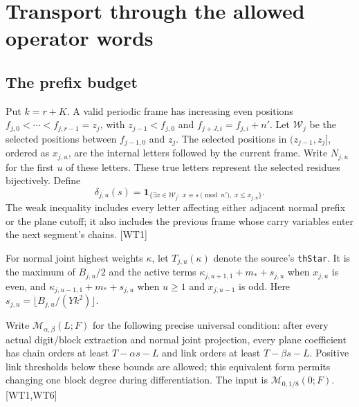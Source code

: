 \section{Transport through the allowed operator words}
\label{sec:word-transport}


\subsection{The prefix budget}

Put $k=r+K$. A valid periodic frame has increasing even positions
$f_{j,0}<\cdots<f_{j,r-1}=z_j$, with
$z_{j-1}<f_{j,0}$ and $f_{j+J,i}=f_{j,i}+n'$.
Let $\mathcal W_j$ be the selected positions between $f_{j-1,0}$ and $z_j$.
The selected positions in $(z_{j-1},z_j]$, ordered as $x_{j,u}$,
are the internal letters followed by the current frame. Write $N_{j,u}$
for the first $u$ of these letters. These true letters represent the selected
residues bijectively. Define
\[
 \delta_{j,u}(s)=
 \mathbf1_{\{\exists x\in\mathcal W_j:\ x\equiv s\pmod {n'},\ x\le x_{j,u}\}}.
 \tag{WT.1}
\]
The weak inequality includes every letter affecting either adjacent
normal prefix or the plane cutoff; it also includes the previous frame
whose carry variables enter the next segment's chains. \textsf{[WT1]}

For normal joint highest weights $\kappa$, let $T_{j,u}(\kappa)$ denote
the source's \texttt{thStar}. It is the maximum of $B_{j,u}/2$ and the
active terms
$\kappa_{j,u+1,1}+m_*+s_{j,u}$ when $x_{j,u}$ is even, and
$\kappa_{j,u-1,1}+m_*+s_{j,u}$ when $u\ge1$ and $x_{j,u-1}$ is odd.
Here $s_{j,u}=\lfloor B_{j,u}/(Yk^2)\rfloor$.

Write $\mathcal M_{\alpha,\beta}(L;F)$ for the following precise universal
condition: after every actual digit/block extraction and normal joint
projection, every plane coefficient has chain orders at least
$T-\alpha s-L$ and link orders at least $T-\beta s-L$.
Positive link thresholds below these bounds are allowed; this equivalent
form permits changing one block degree during differentiation.
The input is $\mathcal M_{0,1/8}(0;F)$. \textsf{[WT1,WT6]}

